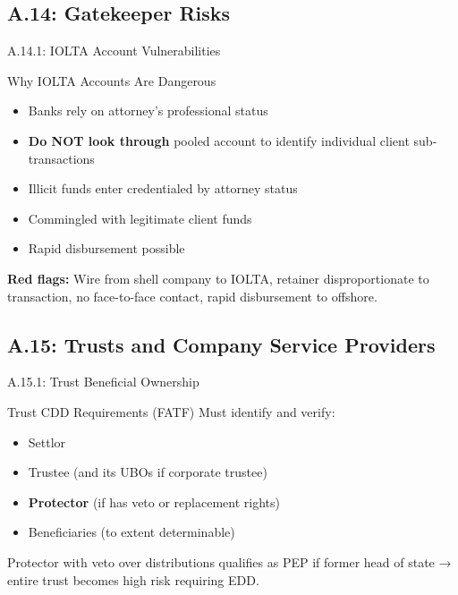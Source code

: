 \documentclass{beamer}
\begin{document}
	\subsection{A.14: Gatekeeper Risks}
	
	\begin{frame}{A.14.1: IOLTA Account Vulnerabilities}
		\begin{block}{Why IOLTA Accounts Are Dangerous}
			\begin{itemize}
				\item Banks rely on attorney's professional status
				\item \textbf{Do NOT look through} pooled account to identify individual client sub-transactions
				\item Illicit funds enter credentialed by attorney status
				\item Commingled with legitimate client funds
				\item Rapid disbursement possible
			\end{itemize}
		\end{block}
		\textbf{Red flags:} Wire from shell company to IOLTA, retainer disproportionate to transaction, no face-to-face contact, rapid disbursement to offshore.
	\end{frame}
	
	\subsection{A.15: Trusts and Company Service Providers}
	
	\begin{frame}{A.15.1: Trust Beneficial Ownership}
		\begin{block}{Trust CDD Requirements (FATF)}
			Must identify and verify:
			\begin{itemize}
				\item Settlor
				\item Trustee (and its UBOs if corporate trustee)
				\item \textbf{Protector} (if has veto or replacement rights)
				\item Beneficiaries (to extent determinable)
			\end{itemize}
		\end{block}
		\textcolor{red}{\textbf{}} Protector with veto over distributions qualifies as PEP if former head of state → entire trust becomes high risk requiring EDD.
	\end{frame}
	
\end{document}
